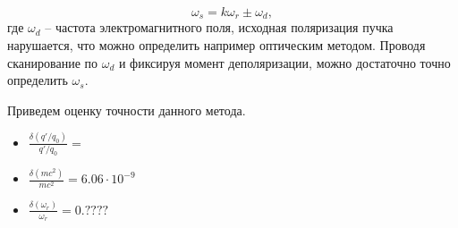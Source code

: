 \begin{equation}
\omega_s=  k\omega_{r} \pm \omega_d,
\end{equation}
где $\omega_d$ -- частота электромагнитного поля, исходная поляризация пучка нарушается, что можно определить например оптическим методом. Проводя сканирование по $\omega_d$ и фиксируя момент деполяризации, можно достаточно точно определить $\omega_s$.
\par Приведем оценку точности данного метода. 
\begin{itemize}
	\item $\displaystyle \frac{\delta (q'/q_0)}{q'/q_0} = $
	\item $\displaystyle \frac{\delta (mc^2)}{mc^2}= 6.06\cdot10^{-9} $
	\item $\displaystyle \frac{\delta (\omega_r)}{\omega_r} = 0.???? $
\end{itemize}
